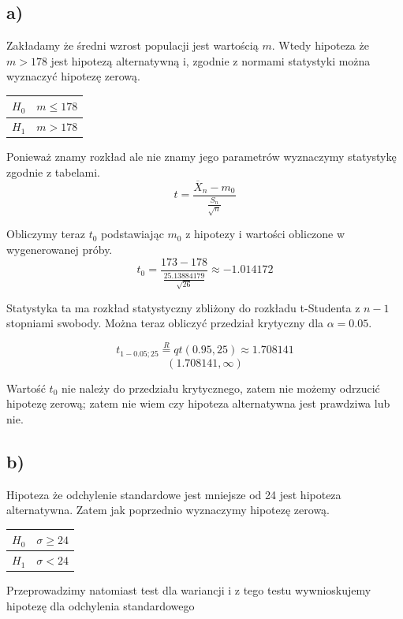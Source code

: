 \documentclass{article}
\begin{document}
\subsection{a)}
Zakładamy że średni wzrost populacji jest wartością $m$. Wtedy hipoteza że $m > 178$ jest hipotezą alternatywną i, zgodnie z normami statystyki można wyznaczyć hipotezę zerową.
\begin{center} \begin{tabular}{|c|c|} \hline
$H_0$ & $m \leq 178$ \\ \hline
$H_1$ & $m > 178$ \\ \hline
\end{tabular} \end{center}

Ponieważ znamy rozkład ale nie znamy jego parametrów wyznaczymy statystykę zgodnie z tabelami.
\[ t = \frac{\overline{X}_n - m_0}{\frac{S_n}{\sqrt{n}}} \]

Obliczymy teraz $t_0$ podstawiając $m_0$ z hipotezy i wartości obliczone w wygenerowanej próby.
\[ t_0 = \frac{173 - 178}{\frac{25.13884179}{\sqrt{26}}} \approx -1.014172 \]

Statystyka ta ma rozkład statystyczny zbliżony do rozkładu t-Studenta z $n-1$ stopniami swobody. Można teraz obliczyć przedział krytyczny dla $\alpha = 0.05$.

\[ t_{1-0.05;25} \overset{R}{=} qt(0.95, 25) \approx 1.708141 \]
\[ ( 1.708141, \infty) \]

Wartość $t_0$ nie należy do przedziału krytycznego, zatem nie możemy odrzucić hipotezę zerową; zatem nie wiem czy hipoteza alternatywna jest prawdziwa lub nie.

\subsection{b)}
Hipoteza że odchylenie standardowe jest mniejsze od 24 jest hipoteza alternatywna. Zatem jak poprzednio wyznaczymy hipotezę zerową.
\begin{center} \begin{tabular}{|c|c|} \hline
$H_0$ & $\sigma \geq 24$ \\ \hline
$H_1$ & $\sigma < 24$ \\ \hline
\end{tabular} \end{center}
Przeprowadzimy natomiast test dla wariancji i z tego testu wywnioskujemy hipotezę dla odchylenia standardowego \\ \par
\end{document}
